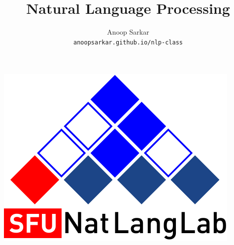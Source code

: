 
\title{\color{RoyalBlue!20}Natural Language Processing}

\author{Anoop Sarkar \\ {\tt anoopsarkar.github.io/nlp-class}}
     
{
\addtocounter{framenumber}{-1}
\begin{frame}
\begin{center}
\vspace{8mm}
\includegraphics[scale=0.35]{figures/natlang-cky-logo}
\end{center}
\titlepage
\end{frame}
}


